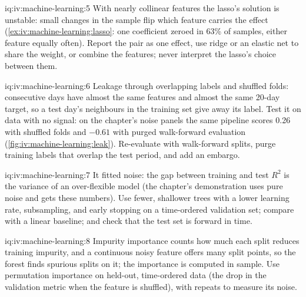 \begin{solution}{iq:iv:machine-learning:5}
With nearly collinear features the lasso's solution is unstable: small changes in the sample flip which feature carries the
effect (\cref{ex:iv:machine-learning:lasso}: one coefficient zeroed in 63\% of samples, either feature equally often). Report
the pair as one effect, use ridge or an elastic net to share the weight, or combine the features; never interpret the lasso's
choice between them.
\end{solution}

\begin{solution}{iq:iv:machine-learning:6}
Leakage through overlapping labels and shuffled folds: consecutive days have almost the same features and almost the same
20-day target, so a test day's neighbours in the training set give away its label. Test it on data with no signal: on the
chapter's noise panels the same pipeline scores 0.26 with shuffled folds and $-0.61$ with purged walk-forward evaluation
(\cref{fig:iv:machine-learning:leak}). Re-evaluate with walk-forward splits, purge training labels that overlap the test
period, and add an embargo.
\end{solution}

\begin{solution}{iq:iv:machine-learning:7}
It fitted noise: the gap between training and test $R^2$ is the variance of an over-flexible model (the chapter's
demonstration uses pure noise and gets these numbers). Use fewer, shallower trees with a lower learning rate, subsampling, and
early stopping on a time-ordered validation set; compare with a linear baseline; and check that the test set is forward in
time.
\end{solution}

\begin{solution}{iq:iv:machine-learning:8}
Impurity importance counts how much each split reduces training impurity, and a continuous noisy feature offers many split
points, so the forest finds spurious splits on it; the importance is computed in sample. Use permutation importance on
held-out, time-ordered data (the drop in the validation metric when the feature is shuffled), with repeats to measure its noise.
\end{solution}

